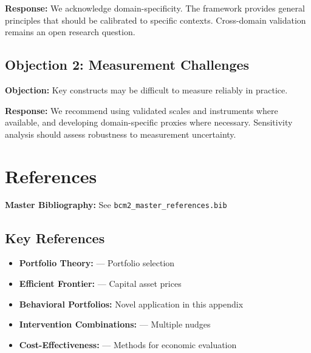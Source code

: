 \textbf{Response:} We acknowledge domain-specificity. The framework provides
general principles that should be calibrated to specific contexts. Cross-domain
validation remains an open research question.

\subsection{Objection 2: Measurement Challenges}

\textbf{Objection:} Key constructs may be difficult to measure reliably in
practice.

\textbf{Response:} We recommend using validated scales and instruments where
available, and developing domain-specific proxies where necessary. Sensitivity
analysis should assess robustness to measurement uncertainty.


\section{References}
\label{sec:mep-references}

\begin{tcolorbox}[colback=blue!5!white, colframe=blue!75!black]
\textbf{Master Bibliography:} See \texttt{bcm2\_master\_references.bib}
\end{tcolorbox}

\subsection{Key References}

\begin{itemize}[nosep]
\item \textbf{Portfolio Theory:} \citet{markowitz1952} --- Portfolio selection
\item \textbf{Efficient Frontier:} \citet{sharpe1964} --- Capital asset prices
\item \textbf{Behavioral Portfolios:} Novel application in this appendix
\item \textbf{Intervention Combinations:} \citet{johnson2021} --- Multiple nudges
\item \textbf{Cost-Effectiveness:} \citet{drummond2015} --- Methods for economic evaluation
\end{itemize}

\nocite{bcm_master}



